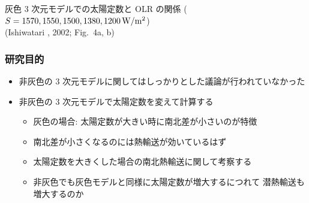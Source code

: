 \documentclass[aspectratio=149,9pt,fleqn]{beamer}
\begin{document}
\begin{frame}
\begin{columns}[b,onlytextwidth]
\begin{column}{.45\textwidth}
\begin{figure}
			\end{figure}
		\end{column}
	\end{columns}
	\begin{center}
		灰色 3 次元モデルでの太陽定数と OLR の関係
		(\(S=1570, 1550, 1500, 1380, 1200\hmu{W/m^2}\))\\
		(Ishiwatari \etal*, 2002; Fig.\ 4a, b)
	\end{center}
\end{frame}


\begin{frame}
	\frametitle{研究目的}
	\begin{itemize}
		\item 非灰色の 3 次元モデルに関してはしっかりとした議論が行われていなかった
		\item 非灰色の 3 次元モデルで太陽定数を変えて計算する
			\begin{itemize}
				\item 灰色の場合: 太陽定数が大きい時に南北差が小さいのが特徴
				\item 南北差が小さくなるのには熱輸送が効いているはず
				\item 太陽定数を大きくした場合の南北熱輸送に関して考察する
				\item 非灰色でも灰色モデルと同様に太陽定数が増大するにつれて
					潜熱輸送も増大するのか
			\end{itemize}
	\end{itemize}
\end{frame}
\end{document}
